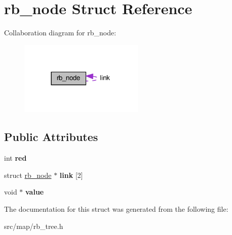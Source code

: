 \hypertarget{structrb__node}{}\section{rb\+\_\+node Struct Reference}
\label{structrb__node}


Collaboration diagram for rb\+\_\+node\+:\nopagebreak
\begin{figure}[H]
\begin{center}
\leavevmode
\includegraphics[width=168pt]{structrb__node__coll__graph}
\end{center}
\end{figure}
\subsection*{Public Attributes}
\begin{DoxyCompactItemize}
\item 
\mbox{\label{structrb__node_ac12d2b253512f2ee39a14fee8e07c427}} 
int {\bfseries red}
\item 
\mbox{\label{structrb__node_a3bd2cfafe2513fc8d59e6ea4d4f9c056}} 
struct \hyperlink{structrb__node}{rb\+\_\+node} $\ast$ {\bfseries link} \mbox{[}2\mbox{]}
\item 
\mbox{\label{structrb__node_a4997cf604002e5a8a4f3925c485e30cc}} 
void $\ast$ {\bfseries value}
\end{DoxyCompactItemize}


The documentation for this struct was generated from the following file\+:\begin{DoxyCompactItemize}
\item 
src/map/rb\+\_\+tree.\+h\end{DoxyCompactItemize}
